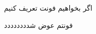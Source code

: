 \documentclass[12pt]{article}
\begin{document}
 اگر بخواهیم فونت تعریف کنیم

{\nast فونتم عوض شدددددددد }
\end{document}
